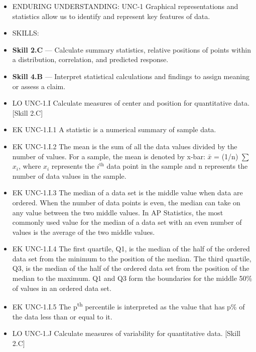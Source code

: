 \documentclass[11pt]{article}
\begin{document}


{\small
\begin{itemize}[leftmargin=1.5em,itemsep=2pt,topsep=2pt]
  \item ENDURING UNDERSTANDING: UNC-1 Graphical representations and statistics allow us to identify and represent key features of data.
  \item SKILLS:
  \item \textbf{Skill 2.C} --- Calculate summary statistics, relative positions of points within a distribution, correlation, and predicted response.
  \item \textbf{Skill 4.B} --- Interpret statistical calculations and findings to assign meaning or assess a claim.
  \item LO UNC-1.I Calculate measures of center and position for quantitative data. [Skill 2.C]
  \item EK UNC-1.I.1 A statistic is a numerical summary of sample data.
  \item EK UNC-1.I.2 The mean is the sum of all the data values divided by the number of values. For a sample, the mean is denoted by x-bar: $\bar{x}$ = (1/n) $\sum$ $x_i$, where $x_i$ represents the $i^{\mathrm{th}}$ data point in the sample and n represents the number of data values in the sample.
  \item EK UNC-1.I.3 The median of a data set is the middle value when data are ordered. When the number of data points is even, the median can take on any value between the two middle values. In AP Statistics, the most commonly used value for the median of a data set with an even number of values is the average of the two middle values.
  \item EK UNC-1.I.4 The first quartile, Q1, is the median of the half of the ordered data set from the minimum to the position of the median. The third quartile, Q3, is the median of the half of the ordered data set from the position of the median to the maximum. Q1 and Q3 form the boundaries for the middle 50\% of values in an ordered data set.
  \item EK UNC-1.I.5 The p\textsuperscript{th} percentile is interpreted as the value that has p\% of the data less than or equal to it.
  \item LO UNC-1.J Calculate measures of variability for quantitative data. [Skill 2.C]

\end{itemize}}
\end{document}
